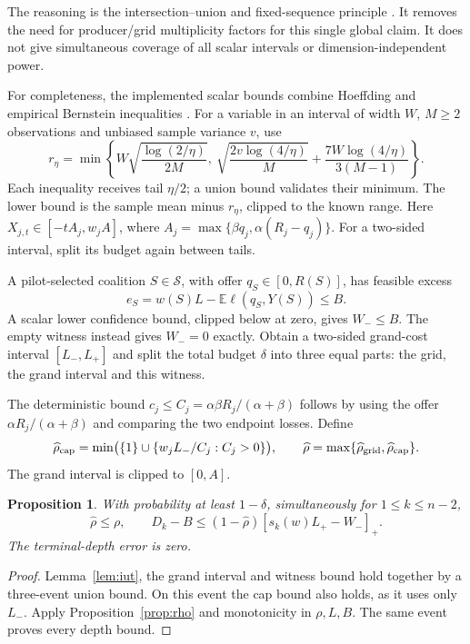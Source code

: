 \documentclass[11pt,a4paper]{article}
\newtheorem{proposition}[theorem]{Proposition}
\theoremstyle{remark}
\newcommand{\E}{\mathbb E}
\newcommand{\pos}[1]{\left[#1\right]_+}
\newcommand{\subsets}{\mathcal S}
\begin{document}
The reasoning is the intersection--union and fixed-sequence
principle \citep{berger1996intersectionunion,hsu1999fixedsequence}.
It removes the need for producer/grid multiplicity factors
for this single global claim. It does not give simultaneous
coverage of all scalar intervals or dimension-independent power.

For completeness, the implemented scalar bounds combine
Hoeffding and empirical Bernstein inequalities
\citep[Theorem 4]{maurer2009empiricalbernstein}. For a variable
in an interval of width $W$, $M\ge2$ observations and unbiased
sample variance $v$, use
\[
 r_\eta=\min\left\{
 W\sqrt{\frac{\log(2/\eta)}{2M}},\
 \sqrt{\frac{2v\log(4/\eta)}{M}}
 +\frac{7W\log(4/\eta)}{3(M-1)}\right\}.
\]
Each inequality receives tail $\eta/2$; a union bound validates
their minimum. The lower bound is the sample mean minus $r_\eta$,
clipped to the known range. Here
$X_{j,t}\in[-tA_j,w_jA]$, where
$A_j=\max\{\beta q_j,\alpha(R_j-q_j)\}$.
For a two-sided interval, split its budget again between tails.

A pilot-selected coalition $S\in\subsets$, with offer
$q_S\in[0,R(S)]$, has feasible excess
\[
 e_S=w(S)L-\E\ell(q_S,Y(S))\le B.
\]
A scalar lower confidence bound, clipped below at zero, gives
$W_-\le B$. The empty witness instead gives $W_-=0$ exactly.
Obtain a two-sided grand-cost interval $[L_-,L_+]$ and split
the total budget $\delta$ into three equal parts: the grid,
the grand interval and this witness.

The deterministic bound
$c_j\le C_j=\alpha\beta R_j/(\alpha+\beta)$ follows by
using the offer $\alpha R_j/(\alpha+\beta)$ and comparing
the two endpoint losses. Define
\[
 \widehat\rho_{\rm cap}
 =\min\bigl(\{1\}\cup\{w_jL_-/C_j:C_j>0\}\bigr),\qquad
 \widehat\rho=\max\{\widehat\rho_{\rm grid},
                    \widehat\rho_{\rm cap}\}.
\]
The grand interval is clipped to $[0,A]$.

\begin{proposition}\label{prop:validation}
With probability at least $1-\delta$, simultaneously for
$1\le k\le n-2$,
\[
 \widehat\rho\le\rho,\qquad
 D_k-B\le (1-\widehat\rho)\pos{s_k(w)L_+-W_-}.
\]
The terminal-depth error is zero.
\end{proposition}
\begin{proof}
Lemma~\ref{lem:iut}, the grand interval and witness bound
hold together by a three-event union bound. On this event
the cap bound also holds, as it uses only $L_-$.
Apply Proposition~\ref{prop:rho} and monotonicity in
$\rho,L,B$. The same event proves every depth bound.
\end{proof}
\end{document}
